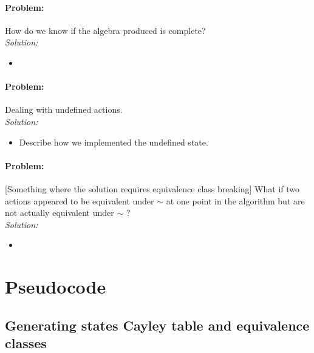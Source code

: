 
\paragraph{Problem:}
How do we know if the algebra produced is complete?
\\\textit{Solution:}
\begin{itemize}
    \item 
\end{itemize}


\paragraph{Problem:}
Dealing with undefined actions.
\\\textit{Solution:}
\begin{itemize}
    \item Describe how we implemented the undefined state.
\end{itemize}

\paragraph{Problem:}
[Something where the solution requires equivalence class breaking]
What if two actions appeared to be equivalent under $\sim$ at one point in the algorithm but are not actually equivalent under $\sim$ ?
\\\textit{Solution:}
\begin{itemize}
    \item 
\end{itemize}


\section{Pseudocode}

\subsection{Generating states Cayley table and equivalence classes}

